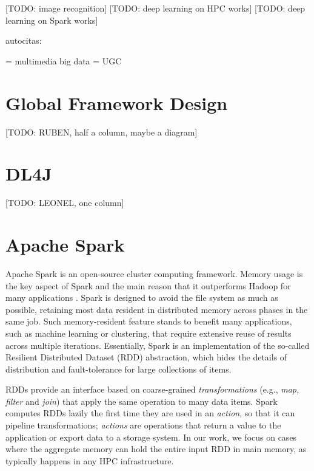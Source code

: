 \documentclass[journal]{IEEEtran}
\begin{document}
[TODO: image recognition]
[TODO: deep learning on HPC works]
[TODO: deep learning on Spark works]
 
autocitas:

\cite{conf/bigmm/TousTA15} = multimedia big data
\cite{conf/bigdataconf/Tous16} = UGC


\section{Global Framework Design}
\label{sec:framework}
[TODO: RUBEN, half a column, maybe a diagram]

\section{DL4J}
\label{sec:spark}
[TODO: LEONEL, one column]

\section{Apache Spark}
\label{sec:spark}

Apache Spark is an open-source cluster computing framework. Memory usage is the key aspect of Spark and the main reason that it outperforms Hadoop for many applications \cite{zaharia2012}. Spark is designed to avoid the file system as much as possible, retaining most data resident in distributed memory across phases in the same job. Such memory-resident feature stands to benefit many applications, such as machine learning or clustering, that require extensive reuse of results across multiple iterations.
Essentially, Spark is an implementation of the so-called Resilient Distributed Dataset (RDD) abstraction, which hides the details of distribution and fault-tolerance for large collections of items.

RDDs provide an interface based on coarse-grained {\it transformations} (e.g., \emph{map, filter} and \emph{join}) that apply the same operation to many data items. Spark computes RDDs lazily the first time they are used in an {\it action}, so that it can pipeline transformations; {\it actions} are operations that return a value to the application or export data to a storage system.
In our work, we focus on cases where the aggregate memory can hold the entire input RDD in main memory, as typically happens in any HPC infrastructure.
\end{document}
